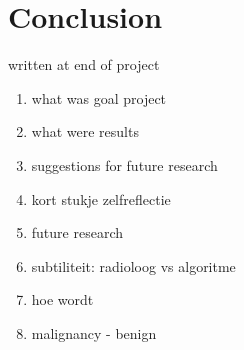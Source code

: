 \section{Conclusion}
written at end of project

\begin{enumerate}
	\item what was goal project
	\item what were results
	\item suggestions for future research
	\item kort stukje zelfreflectie
	\item future research
	\item subtiliteit: radioloog vs algoritme
	\item hoe wordt
	\item malignancy - benign 
\end{enumerate}
